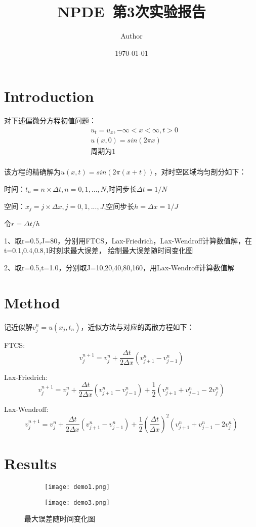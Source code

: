 \documentclass{article}
\title{NPDE~第3次实验报告}
\author{Author}
\date{\today}
\begin{document}
\maketitle

\section{Introduction}

对下述偏微分方程初值问题：
$$
\begin{aligned}
    &u_t=u_x,-\infty<x<\infty,t>0\\
    &u(x,0)=sin(2\pi x)\\
    &\text{周期为1}\\
\end{aligned}
$$

该方程的精确解为$u(x,t)=sin(2\pi(x+t))$，对时空区域均匀剖分如下：

时间：$t_n=n\times \Delta t,n=0,1,...,N$,时间步长$\Delta t=1/N$

空间：$x_j=j\times \Delta x,j=0,1,...,J$,空间步长$h=\Delta x=1/J$

令$r=\Delta t/h$

1、取r=0.5,J=80，分别用FTCS，Lax-Friedrich，Lax-Wendroff计算数值解，在t=0.1,0.4,0.8,1时刻求最大误差，
绘制最大误差随时间变化图

2、取r=0.5,t=1.0，分别取J=10,20,40,80,160，用Lax-Wendroff计算数值解
\section{Method}

记近似解$v_j^n=u(x_j,t_n)$，近似方法与对应的离散方程如下：

FTCS:$$v_j^{n+1}=v_j^n+\frac{\Delta t}{2\Delta x}(v_{j+1}^n-v_{j-1}^n)$$

Lax-Friedrich:$$v_j^{n+1}=v_j^n+\frac{\Delta t}{2\Delta x}(v_{j+1}^n-v_{j-1}^n)+\frac{1}{2}(v_{j+1}^n+v_{j-1}^n-2v_j^n)$$

Lax-Wendroff:$$v_j^{n+1}=v_j^n+\frac{\Delta t}{2\Delta x}(v_{j+1}^n-v_{j-1}^n)+\frac{1}{2}(\frac{\Delta t}{\Delta x})^2(v_{j+1}^n+v_{j-1}^n-2v_j^n)$$

\section{Results}

\begin{figure}[H]
    \centering
    \begin{subfigure}{.4\textwidth}
        \texttt{[image: demo1.png]}    
    \end{subfigure}
    \begin{subfigure}{.4\textwidth}
        \texttt{[image: demo3.png]}        
    \end{subfigure}
    \caption{最大误差随时间变化图}\label{fig:demo1}
\end{figure}
\end{document}

